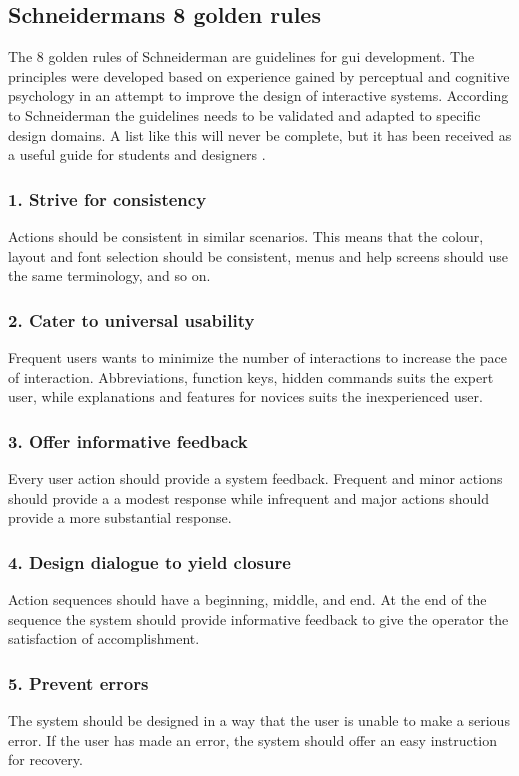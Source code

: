 \subsection{Schneidermans 8 golden rules}
\label{sec:schneiderman}
The 8 golden rules of Schneiderman are guidelines for \acrshort{gui} development. The principles were developed based on experience gained by perceptual and cognitive psychology in an attempt to improve the design of interactive systems. According to Schneiderman the guidelines needs to be validated and adapted to specific design domains. A list like this will never be complete, but it has been received as a useful guide for students and designers \cite{schneiderman}.

\subsubsection{1. Strive for consistency}
Actions should be consistent in similar scenarios. This means that the colour, layout and font selection should be consistent, menus and help screens should use the same terminology, and so on.

\subsubsection{2. Cater to universal usability}
Frequent users wants to minimize the number of interactions to increase the pace of interaction. Abbreviations, function keys, hidden commands suits the expert user, while explanations and features for novices suits the inexperienced user.

\subsubsection{3. Offer informative feedback}
Every user action should provide a system feedback. Frequent and minor actions should provide a a modest response while infrequent and major actions should provide a more substantial response.

\subsubsection{4. Design dialogue to yield closure}
Action sequences should have a beginning, middle, and end. At the end of the sequence the system should provide informative feedback to give the operator the satisfaction of accomplishment.

\subsubsection{5. Prevent errors}
The system should be designed in a way that the user is unable to make a serious error. If the user has made an error, the system should offer an easy instruction for recovery.

